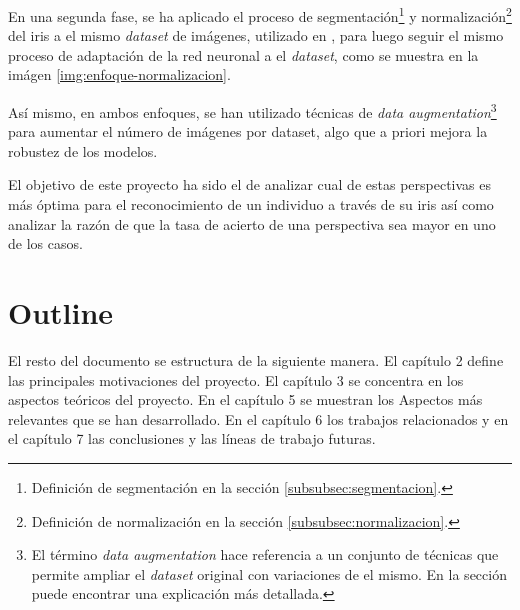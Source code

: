 

En una segunda fase, se ha aplicado el proceso de segmentación\footnote{Definición de segmentación en la sección \ref{subsubsec:segmentacion}.} y normalización\footnote{Definición de normalización en la sección \ref{subsubsec:normalizacion}.} del iris a el mismo \textit{dataset} de imágenes, utilizado en \cite{tfg_iris_2020}, para luego seguir el mismo proceso de adaptación de la red neuronal
a el \textit{dataset}, como se muestra en la imágen \ref{img:enfoque-normalizacion}.


Así mismo, en ambos enfoques, se han utilizado técnicas de \textit{data augmentation}\footnote{El término \textit{data augmentation} hace referencia a un conjunto de técnicas que permite ampliar el \textit{dataset} original con variaciones de el mismo. En la sección  puede encontrar una explicación más detallada.} para aumentar el número de imágenes por dataset, algo que a priori mejora la robustez de los modelos.


El objetivo de este proyecto ha sido el de analizar cual de estas perspectivas es más óptima para el reconocimiento de un individuo a través de su iris así como analizar la razón de que la tasa de acierto de una perspectiva sea mayor en uno de los casos.

\section{Outline}

El resto del documento se estructura de la siguiente manera. El capítulo 2  define las principales motivaciones del proyecto. El capítulo 3  se concentra en los aspectos teóricos del proyecto. En el capítulo 5  se muestran los Aspectos
más relevantes que se han desarrollado. En el capítulo 6  los trabajos relacionados y en el capítulo 7  las conclusiones y las líneas de trabajo futuras.
